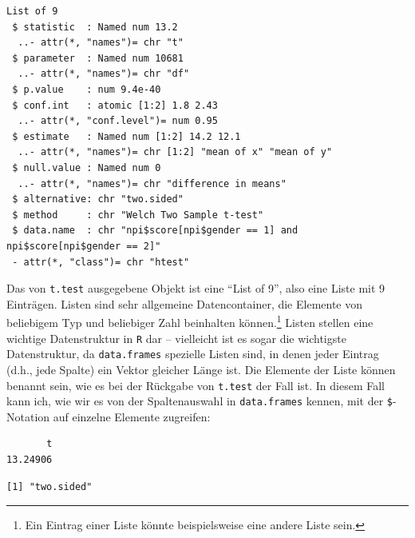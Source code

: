 \documentclass[12pt,]{tufte-book}
\newenvironment{Shaded}{\begin{snugshade}}{\end{snugshade}}
\newcommand{\CommentTok}[1]{\textcolor[rgb]{0.56,0.35,0.01}{\textit{#1}}}
\newcommand{\OperatorTok}[1]{\textcolor[rgb]{0.81,0.36,0.00}{\textbf{#1}}}
\newcommand{\NormalTok}[1]{#1}
\theoremstyle{definition}
\theoremstyle{definition}
\theoremstyle{definition}
\theoremstyle{remark}
\begin{document}
\begin{verbatim}
List of 9
 $ statistic  : Named num 13.2
  ..- attr(*, "names")= chr "t"
 $ parameter  : Named num 10681
  ..- attr(*, "names")= chr "df"
 $ p.value    : num 9.4e-40
 $ conf.int   : atomic [1:2] 1.8 2.43
  ..- attr(*, "conf.level")= num 0.95
 $ estimate   : Named num [1:2] 14.2 12.1
  ..- attr(*, "names")= chr [1:2] "mean of x" "mean of y"
 $ null.value : Named num 0
  ..- attr(*, "names")= chr "difference in means"
 $ alternative: chr "two.sided"
 $ method     : chr "Welch Two Sample t-test"
 $ data.name  : chr "npi$score[npi$gender == 1] and npi$score[npi$gender == 2]"
 - attr(*, "class")= chr "htest"
\end{verbatim}

Das von \texttt{t.test} ausgegebene Objekt ist eine ``List of 9'', also
eine Liste mit 9 Einträgen. Listen sind sehr allgemeine Datencontainer,
die Elemente von beliebigem Typ und beliebiger Zahl beinhalten
können.\footnote{Ein Eintrag einer Liste könnte beispielsweise eine
  andere Liste sein.} Listen stellen eine wichtige Datenstruktur in
\texttt{R} dar -- vielleicht ist es sogar die wichtigste Datenstruktur,
da \texttt{data.frames} spezielle Listen sind, in denen jeder Eintrag
(d.h., jede Spalte) ein Vektor gleicher Länge ist. Die Elemente der
Liste können benannt sein, wie es bei der Rückgabe von \texttt{t.test}
der Fall ist. In diesem Fall kann ich, wie wir es von der Spaltenauswahl
in \texttt{data.frames} kennen, mit der \texttt{\$}-Notation auf
einzelne Elemente zugreifen:

\begin{Shaded}
\end{Shaded}

\begin{verbatim}
       t 
13.24906 
\end{verbatim}

\begin{Shaded}
\end{Shaded}

\begin{verbatim}
[1] "two.sided"
\end{verbatim}
\end{document}
